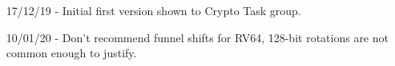 
\begin{itemize}
\item[17/12/19] - Initial first version shown to Crypto Task group.
\item[10/01/20] - Don't recommend funnel shifts for RV64, 128-bit rotations
                  are not common enough to justify.
\end{itemize}
